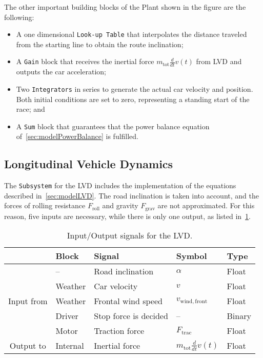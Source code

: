 The other important building blocks of the Plant shown in the figure are the following:
\begin{itemize}
	\item A one dimensional \texttt{Look-up Table} that interpolates the distance traveled from the starting line to obtain the route inclination;
	\item A \texttt{Gain} block that receives the inertial force $m_\mathrm{tot} \frac{d}{dt} v(t)$ from LVD and outputs the car acceleration;
	\item Two \texttt{Integrators} in series to generate the actual car velocity and position. Both initial conditions are set to zero, representing a standing start of the race; and
	\item A \texttt{Sum} block that guarantees that the power balance equation of~\cref{sec:modelPowerBalance} is fulfilled.
\end{itemize}


\subsection{Longitudinal Vehicle Dynamics}
\label{sec:simLVD}
The \texttt{Subsystem} for the LVD includes the implementation of the equations described in~\cref{sec:modelLVD}. The road inclination is taken into account, and the forces of rolling resistance $F_\mathrm{roll}$ and gravity $F_\mathrm{grav}$ are not approximated. For this reason, five inputs are necessary, while there is only one output, as listed in~\cref{tab:simInOutLVD}.
\begin{table}[htbp]
	\centering
	\caption{Input/Output signals for the LVD.}
	\label{tab:simInOutLVD}
	
	\begin{tabular}{c l l l l}
		\toprule
		& Block & Signal & Symbol & Type \\ 
		\midrule
		\multirow{5}{*}{Input from}
		& -- & Road inclination & $\alpha$ & Float \\
		& Weather & Car velocity & $v$ & Float \\
		& Weather & Frontal wind speed & $v_\mathrm{wind,front}$ & Float \\
		& Driver & Stop force is decided & -- & Binary \\
		& Motor & Traction force & $F_\mathrm{trac}$ & Float \\
		\midrule
		\multirow{1}{*}{Output to}
		& Internal & Inertial force & $m_\mathrm{tot} \frac{d}{dt} v(t)$ & Float \\
		\bottomrule
	\end{tabular}
\end{table}

